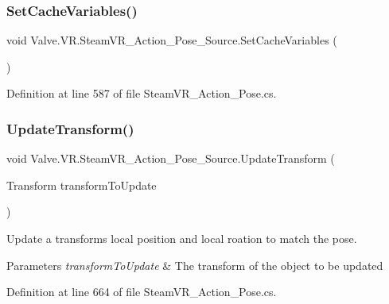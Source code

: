 \subsubsection{\texorpdfstring{SetCacheVariables()}{SetCacheVariables()}}
{\footnotesize\ttfamily void Valve.\+V\+R.\+Steam\+V\+R\+\_\+\+Action\+\_\+\+Pose\+\_\+\+Source.\+Set\+Cache\+Variables (\begin{DoxyParamCaption}{ }\end{DoxyParamCaption})\hspace{0.3cm}{\ttfamily [protected]}}



Definition at line 587 of file Steam\+V\+R\+\_\+\+Action\+\_\+\+Pose.\+cs.

\mbox{\label{class_valve_1_1_v_r_1_1_steam_v_r___action___pose___source_ae38259c05b8d3c9562e025d9efa18002}} 
\subsubsection{\texorpdfstring{UpdateTransform()}{UpdateTransform()}}
{\footnotesize\ttfamily void Valve.\+V\+R.\+Steam\+V\+R\+\_\+\+Action\+\_\+\+Pose\+\_\+\+Source.\+Update\+Transform (\begin{DoxyParamCaption}\item[{Transform}]{transform\+To\+Update }\end{DoxyParamCaption})}



Update a transform\textquotesingle{}s local position and local roation to match the pose. 


\begin{DoxyParams}{Parameters}
{\em transform\+To\+Update} & The transform of the object to be updated\\
\hline
\end{DoxyParams}


Definition at line 664 of file Steam\+V\+R\+\_\+\+Action\+\_\+\+Pose.\+cs.

\mbox{\label{class_valve_1_1_v_r_1_1_steam_v_r___action___pose___source_a2b299c57d8709519f9dfb91da28bde4e}} 
